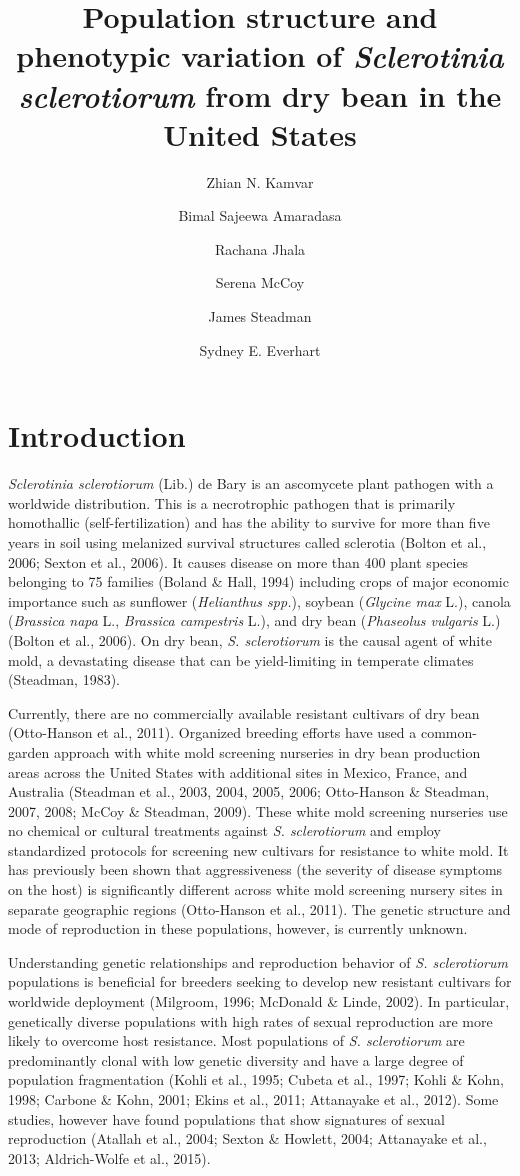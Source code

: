 \documentclass[fleqn,10pt,lineno]{wlpeerj} %
\title{Population structure and phenotypic variation of \emph{Sclerotinia
sclerotiorum} from dry bean in the United States}
\author[1]{Zhian N. Kamvar}
\author[1]{Bimal Sajeewa Amaradasa}
\author[1]{Rachana Jhala}
\author[1]{Serena McCoy}
\author[1]{James Steadman}
\author[1]{Sydney E. Everhart}
\affil[1]{Department of Plant Pathology, University of Nebraska-Lincoln, Lincoln,
NE 68583}
\theoremstyle{definition}
\theoremstyle{definition}
\theoremstyle{definition}
\theoremstyle{remark}
\begin{document}
\flushbottom
\maketitle
\thispagestyle{empty}

\section*{Introduction}\label{introduction}

\emph{Sclerotinia sclerotiorum} (Lib.) de Bary is an ascomycete plant
pathogen with a worldwide distribution. This is a necrotrophic pathogen
that is primarily homothallic (self-fertilization) and has the ability
to survive for more than five years in soil using melanized survival
structures called sclerotia (Bolton et al., 2006; Sexton et al., 2006).
It causes disease on more than 400 plant species belonging to 75
families (Boland \& Hall, 1994) including crops of major economic
importance such as sunflower (\emph{Helianthus spp.}), soybean
(\emph{Glycine max} L.), canola (\emph{Brassica napa} L., \emph{Brassica
campestris} L.), and dry bean (\emph{Phaseolus vulgaris} L.) (Bolton et
al., 2006). On dry bean, \emph{S. sclerotiorum} is the causal agent of
white mold, a devastating disease that can be yield-limiting in
temperate climates (Steadman, 1983).

Currently, there are no commercially available resistant cultivars of
dry bean (Otto-Hanson et al., 2011). Organized breeding efforts have
used a common-garden approach with white mold screening nurseries in dry
bean production areas across the United States with additional sites in
Mexico, France, and Australia (Steadman et al., 2003, 2004, 2005, 2006;
Otto-Hanson \& Steadman, 2007, 2008; McCoy \& Steadman, 2009). These
white mold screening nurseries use no chemical or cultural treatments
against \emph{S. sclerotiorum} and employ standardized protocols for
screening new cultivars for resistance to white mold. It has previously
been shown that aggressiveness (the severity of disease symptoms on the
host) is significantly different across white mold screening nursery
sites in separate geographic regions (Otto-Hanson et al., 2011). The
genetic structure and mode of reproduction in these populations,
however, is currently unknown.

Understanding genetic relationships and reproduction behavior of
\emph{S. sclerotiorum} populations is beneficial for breeders seeking to
develop new resistant cultivars for worldwide deployment (Milgroom,
1996; McDonald \& Linde, 2002). In particular, genetically diverse
populations with high rates of sexual reproduction are more likely to
overcome host resistance. Most populations of \emph{S. sclerotiorum} are
predominantly clonal with low genetic diversity and have a large degree
of population fragmentation (Kohli et al., 1995; Cubeta et al., 1997;
Kohli \& Kohn, 1998; Carbone \& Kohn, 2001; Ekins et al., 2011;
Attanayake et al., 2012). Some studies, however have found populations
that show signatures of sexual reproduction (Atallah et al., 2004;
Sexton \& Howlett, 2004; Attanayake et al., 2013; Aldrich-Wolfe et al.,
2015).
\end{document}
